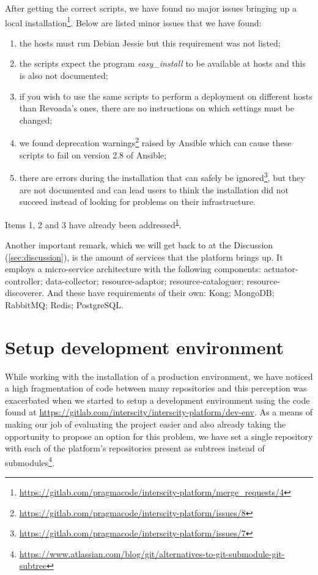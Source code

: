 \documentclass[paper=a4, fontsize=11pt]{scrartcl}
\numberwithin{equation}{section}    %
\numberwithin{figure}{section}      %
\numberwithin{table}{section}        %
\begin{document}
  After getting the correct scripts, we have found no major issues bringing up a local installation\footnote{\label{installation-mr}\url{https://gitlab.com/pragmacode/interscity-platform/merge_requests/4}}. Below are listed minor issues that we have found:

  \begin{enumerate}
    \item the hosts must run Debian Jessie but this requirement was not listed;
    \item the scripts expect the program \textit{easy\_install} to be available at hosts and this is also not documented;
    \item if you wish to use the same scripts to perform a deployment on different hosts than Revoada's ones, there are no instructions on which settings must be changed;
    \item we found deprecation warnings\footnote{\url{https://gitlab.com/pragmacode/interscity-platform/issues/8}} raised by Ansible which can cause these scripts to fail on version 2.8 of Ansible;
    \item there are errors during the installation that can safely be ignored\footnote{\url{https://gitlab.com/pragmacode/interscity-platform/issues/7}}, but they are not documented and can lead users to think the installation did not succeed instead of looking for problems on their infrastructure.
  \end{enumerate}

  Items 1, 2 and 3 have already been addressed\textsuperscript{\ref{installation-mr}}.

  Another important remark, which we will get back to at the Discussion (\ref{sec:discussion}), is the amount of services that the platform brings up. It employs a micro-service architecture with the following components: actuator-controller; data-collector; resource-adaptor; resource-cataloguer; resource-discoverer. And these have requirements of their own: Kong; MongoDB; RabbitMQ; Redis; PostgreSQL.

\section{Setup development environment}
  While working with the installation of a production environment, we have noticed a high fragmentation of code between many repositories and this perception was exacerbated when we started to setup a development environment using the code found at \url{https://gitlab.com/interscity/interscity-platform/dev-env}. As a means of making our job of evaluating the project easier and also already taking the opportunity to propose an option for this problem, we have set a single repository with each of the platform's repositories present as subtrees instead of submodules\footnote{\url{https://www.atlassian.com/blog/git/alternatives-to-git-submodule-git-subtree}}.
\end{document}
